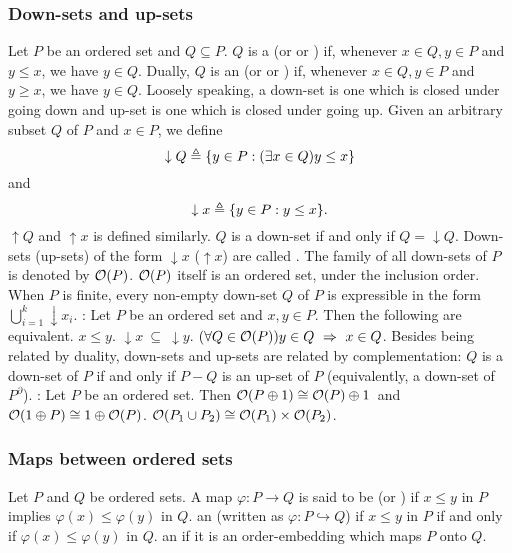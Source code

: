 \subsubsection{Down-sets and up-sets}
\bit
\w Let $P$ be an ordered set and $Q \subseteq P$.
  \ben
  \w $Q$ is a  (or  or )
  if, whenever $x \in Q, y \in P$ and $y \le x$, we have $y \in Q$.
  \w Dually, $Q$ is an  (or  or ) if, whenever $x \in Q, y \in P$ and $y \ge x$, we have $y \in Q$.
  \een
\w Loosely speaking, a down-set is one which is closed under going down and
  up-set is one which is closed under going up.
\w Given an arbitrary subset $Q$ of $P$ and $x \in P$, we define
  \[\downarrow Q \triangleq \{y \in P: (\exists x \in Q) y \le x\}\]
  and
  \[ \downarrow x \triangleq \{y \in P: y \le x\}.\]
  $\uparrow Q$ and $\uparrow x$ is defined similarly.
\w $Q$ is a down-set if and only if $Q = \downarrow Q$.
\w Down-sets (up-sets) of the form $\downarrow x$ ($\uparrow x$) are called
. 
\w The  family of all down-sets of $P$
  is denoted by ${\cal O}(P)$. 
\w ${\cal O}(P)$ itself is an ordered set, under the inclusion order.
\w When $P$ is finite, every non-empty down-set $Q$ of $P$ is expressible in
the form $\bigcup_{i=1}^k \downarrow x_i$.
: Let $P$ be an ordered set and $x, y \in P$. Then the
following are equivalent.
 \ben
 \w [(a)] $x \le y$.
 \w [(b)] $\downarrow x\ \subseteq\ \downarrow y$.
 \w [(c)] $(\forall Q \in {\cal O}(P)) y \in Q \ \Rightarrow\ x \in Q$.
 \een
\w Besides being related by duality, down-sets and up-sets are related by
complementation: $Q$ is a down-set of $P$ if and only if $P - Q$ is an up-set
of $P$ (equivalently, a down-set of $P^\partial$).
: Let $P$ be an ordered set. Then
 \ben
 \w [(a)] ${\cal O}(P \oplus \mbox{{1}}) \cong
      {\cal O}(P) \oplus \mbox{{1}}$\ and\
      ${\cal O}(\mbox{{1}} \oplus P) \cong
      \mbox{{1}} \oplus {\cal O}(P)$.
 \w [(b)] ${\cal O}(P_1 \cup P_2) \cong {\cal O}(P_1) \times {\cal O}(P_2)$.
 \een
\eit

\subsubsection{Maps between ordered sets}
\bit
\w Let $P$ and $Q$ be ordered sets. A map $\varphi: P \rightarrow Q$ is said
to be 
 \ben
 \w [(a)]  (or ) if $x \le y$ in $P$ implies
 $\varphi(x) \le \varphi(y)$ in $Q$.
 \w [(b)] an  (written as $\varphi: P \hookrightarrow Q$)
 if $x \le y$ in $P$ if and only if $\varphi(x) \le \varphi(y)$ in $Q$.
 \w [(c)] an \bb{order-isomorphism} if it is an order-embedding which maps $P$
 onto $Q$.
 \een
\eit


